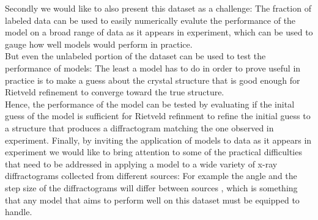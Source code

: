 Secondly we would like to also present this dataset as a challenge: The fraction of labeled data can be used to
easily numerically evalute the performance of the model on a broad range of data as it appears in experiment, which can be used
to gauge how well models would perform in practice. \\
But even the unlabeled portion of the dataset can be used to test the performance of models: The least a model
has to do in order to prove useful in practice is to make a guess about the crystal structure that is good enough
for Rietveld refinement to converge toward the true structure. \\
Hence, the performance of the model can be tested by evaluating if the inital guess of the model is sufficient for
Rietveld refinment to refine the initial guess to a structure that produces a diffractogram matching the one observed in experiment.
Finally, by inviting the application of models to data as it appears in experiment we would like to bring attention
to some of the practical difficulties that need to be addressed in applying a model to a wide variety of x-ray diffractograms
collected from different sources: For example the angle and the step size of the diffractograms will differ between sources
, which is something that any model that aims to perform well on this dataset must be equipped to handle.









